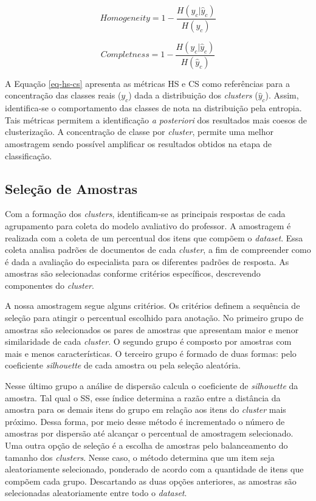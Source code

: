 \begin{equation}
Homogeneity = 1 - \frac{H(y_{c} | \hat{y}_{c})}{H(y_{c})}
\label{eq-hs-cs}
\end{equation}

\begin{equation*}
Completness = 1 - \frac{H(y_{c} | \hat{y}_{c})}{H(\hat{y}_{c})}
\end{equation*}

A Equação \ref{eq-hs-cs} apresenta as métricas HS e CS como referências para a concentração das classes reais ($y_{c}$) dada a distribuição dos \textit{clusters} ($\hat{y}_{c}$). Assim, identifica-se o comportamento das classes de nota na distribuição pela entropia. Tais métricas permitem a identificação \textit{a posteriori} dos resultados mais coesos de clusterização. A concentração de classe por \textit{cluster}, permite uma melhor amostragem sendo possível amplificar os resultados obtidos na etapa de classificação.


\subsection{Seleção de Amostras}
\label{subsec-selecao-amostras}

Com a formação dos \textit{clusters}, identificam-se as principais respostas de cada agrupamento para coleta do modelo avaliativo do professor. A amostragem é realizada com a coleta de um percentual dos itens que compõem o \textit{dataset}. Essa coleta analisa padrões de documentos de cada \textit{cluster}, a fim de compreender como é dada a avaliação do especialista para os diferentes padrões de resposta. As amostras são selecionadas conforme critérios específicos, descrevendo componentes do \textit{cluster}. 

A nossa amostragem segue alguns critérios. Os critérios definem a sequência de seleção para atingir o percentual escolhido para anotação. No primeiro grupo de amostras são selecionados os pares de amostras que apresentam maior e menor similaridade de cada \textit{cluster}. O segundo grupo é composto por amostras com mais e menos características. O terceiro grupo é formado de duas formas: pelo coeficiente \textit{silhouette} \cite{rousseeuw1987} de cada amostra ou pela seleção aleatória.

Nesse último grupo a análise de dispersão calcula o coeficiente de \textit{silhouette} da amostra. Tal qual o SS, esse índice determina a razão entre a distância da amostra para os demais itens do grupo em relação aos itens do \textit{cluster} mais próximo. Dessa forma, por meio desse método é incrementado o número de amostras por dispersão até alcançar o percentual de amostragem selecionado. Uma outra opção de seleção é a escolha de amostras pelo balanceamento do tamanho dos \textit{clusters}. Nesse caso, o método determina que um item seja aleatoriamente selecionado, ponderado de acordo com a quantidade de itens que compõem cada grupo. Descartando as duas opções anteriores, as amostras são selecionadas aleatoriamente entre todo o \textit{dataset}.

